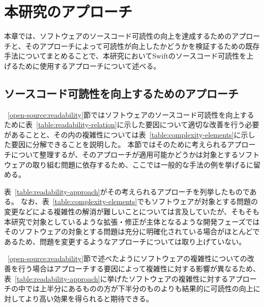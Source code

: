\chapter{本研究のアプローチ}
\label{readability}

本章では、ソフトウェアのソースコード可読性の向上を達成するためのアプローチと、そのアプローチによって可読性が向上したかどうかを検証するための既存手法についてまとめることで、本研究においてSwiftのソースコード可読性を上げるために使用するアプローチについて述べる。

\section{ソースコード可読性を向上するためのアプローチ}
\label{readability:approach}

~\ref{open-source:readability}節ではソフトウェアのソースコード可読性を向上するために表~\ref{table:readability-relation}に示した要因について適切な改善を行う必要があることと、その内の複雑性については表~\ref{table:complexity-elements}に示した要因に分解できることを説明した。
本節ではそのために考えられるアプローチについて整理するが、そのアプローチが適用可能かどうかは対象とするソフトウェアの取り組む問題に依存するため、ここでは一般的な手法の例を挙げるに留める。

表~\ref{table:readability-approach}がその考えられるアプローチを列挙したものである。
なお、表~\ref{table:complexity-elements}でもソフトウェアが対象とする問題の変更などによる複雑性の解消が難しいことについては言及していたが、そもそも本研究で対象としているような拡張・修正が主体となるような開発フェーズではそのソフトウェアの対象とする問題は充分に明確化されている場合がほとんどであるため、問題を変更するようなアプローチについては取り上げていない。

~\ref{open-source:readability}節で述べたようにソフトウェアの複雑性についての改善を行う場合はアプローチする要因によって複雑性に対する影響が異なるため、表~\ref{table:readability-approach}に挙げたソフトウェアの複雑性に対するアプローチの中では上半分にあるものの方が下半分のものよりも結果的に可読性の向上に対してより高い効果を得られると期待できる。

